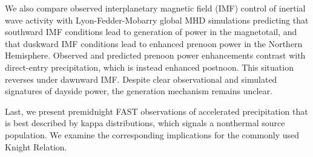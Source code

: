 We also compare observed interplanetary magnetic field (IMF) control of inertial
\Alf wave activity with Lyon-Fedder-Mobarry global MHD simulations predicting
that southward IMF conditions lead to generation of \Alfic power in the
magnetotail, and that duskward IMF conditions lead to enhanced prenoon \Alfic
power in the Northern Hemisphere. Observed and predicted prenoon \Alfic power
enhancements contrast with direct-entry precipitation, which is instead enhanced
postnoon. This situation reverses under dawnward IMF. Despite clear
observational and simulated signatures of dayside \Alfic power, the generation
mechanism remains unclear.

Last, we present premidnight FAST observations of accelerated precipitation that
is best described by kappa distributions, which signals a nonthermal source
population. We examine the corresponding implications for the commonly used
Knight Relation.




